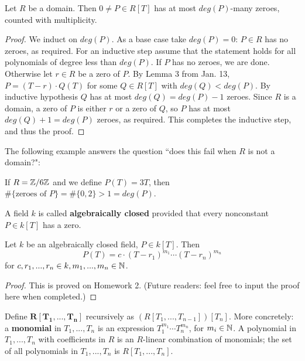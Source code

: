 \begin{cor}
Let $R$ be a domain. Then $0 \neq P \in R[T]$ has at most $deg(P)$-many zeroes, counted with multiplicity.
\end{cor}
\begin{proof}
We induct on $deg(P)$. As a base case take $deg(P) = 0$: $P \in R$ has no zeroes, as required. For an inductive step assume that the statement holds for all polynomials of degree less than $deg(P)$. If $P$ has no zeroes, we are done. Otherwise let $r \in R$ be a zero of $P$. By Lemma 3 from Jan. 13, $P = (T - r) \cdot Q(T)$ for some $Q \in R[T]$ with $deg(Q) < deg(P)$. By inductive hypothesis $Q$ has at most $deg(Q) = deg(P) - 1$ zeroes. Since $R$ is a domain, a zero of $P$ is either $r$ or a zero of $Q$, so $P$ has at most $deg(Q) + 1 = deg(P)$ zeroes, as required. This completes the inductive step, and thus the proof.
\end{proof}
The following example answers the question ``does this fail when $R$ is not a domain?":
\begin{ex}
If $R = \mathbb{Z} / 6\mathbb{Z}$ and we define $P(T) = 3T$, then $\#\{ \text{zeroes of } P \} = \#\{0, 2\} > 1 = deg(P)$.
\end{ex}

\begin{defn}
A field $k$ is called \textbf{algebraically closed} provided that every nonconstant $P \in k[T]$ has a zero.
\end{defn}

\begin{prop}
Let $k$ be an algebraically closed field, $P \in k[T]$. Then
\[P(T) = c \cdot (T - r_1)^{m_1} \cdots (T - r_n)^{m_n}\]
for $c, r_1, ..., r_n \in k, m_1, ..., m_n \in \mathbb{N}$.
\end{prop}

\begin{proof}
This is proved on Homework 2. (Future readers: feel free to input the proof here when completed.)
\end{proof}

\begin{defn}
Define $\mathbf{R[T_1, ..., T_n]}$ recursively as $(R[T_1, ..., T_{n-1}])[T_n]$. More concretely: a \textbf{monomial} in $T_1, ..., T_n$ is an expression $T_1^{m_1} \cdots T_n^{m_n}$, for $m_i \in \mathbb{N}$. A polynomial in $T_1, ..., T_n$ with coefficients in $R$ is an $R$-linear combination of monomials; the set of all polynomials in $T_1, ..., T_n$ is $R[T_1, ..., T_n]$.
\end{defn}

